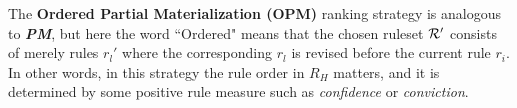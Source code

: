 The \textbf{Ordered Partial Materialization (OPM)} ranking strategy is analogous to \textbf{\emph{PM}}, but here the word ``Ordered" means that the chosen ruleset $\mathcal{R}'$ consists of merely rules $r_l'$ where the corresponding $r_l$ is revised before the current rule $r_i$. In other words, in this strategy the rule order in $R_H$ matters, and it is determined by some positive rule measure such as \textit{confidence} or \textit{conviction}.